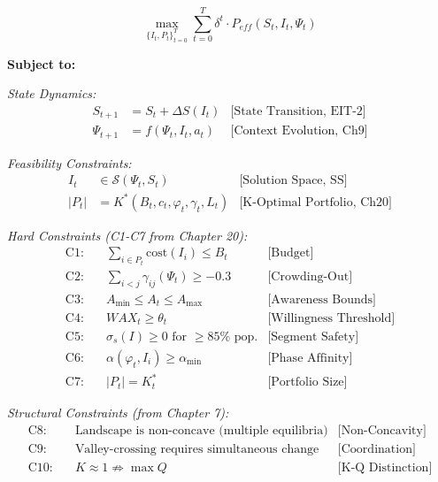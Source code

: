 \begin{tcolorbox}[colback=blue!5!white, colframe=blue!75!black,
    title=\textbf{The EBF Master Problem (MP-1)}]

\begin{equation}
\boxed{
\max_{\{I_t, P_t\}_{t=0}^T} \sum_{t=0}^{T} \delta^t \cdot P_{eff}(S_t, I_t, \Psi_t)
}
\label{eq:mp-objective}
\end{equation}

\textbf{Subject to:}

\vspace{0.3em}
\textit{State Dynamics:}
\begin{align}
S_{t+1} &= S_t + \Delta S(I_t) & \text{[State Transition, EIT-2]} \label{eq:mp-state} \\
\Psi_{t+1} &= f(\Psi_t, I_t, a_t) & \text{[Context Evolution, Ch9]} \label{eq:mp-context}
\end{align}

\textit{Feasibility Constraints:}
\begin{align}
I_t &\in \mathcal{S}(\Psi_t, S_t) & \text{[Solution Space, SS]} \label{eq:mp-feasible} \\
|P_t| &= K^*(B_t, c_t, \varphi_t, \gamma_t, L_t) & \text{[K-Optimal Portfolio, Ch20]} \label{eq:mp-kstar}
\end{align}

\textit{Hard Constraints (C1-C7 from Chapter 20):}
\begin{align}
\text{C1:} \quad & \sum_{i \in P_t} \text{cost}(I_i) \leq B_t & \text{[Budget]} \\
\text{C2:} \quad & \sum_{i < j} \gamma_{ij}(\Psi_t) \geq -0.3 & \text{[Crowding-Out]} \\
\text{C3:} \quad & A_{\min} \leq A_t \leq A_{\max} & \text{[Awareness Bounds]} \\
\text{C4:} \quad & WAX_t \geq \theta_t & \text{[Willingness Threshold]} \\
\text{C5:} \quad & \sigma_s(I) \geq 0 \text{ for } \geq 85\% \text{ pop.} & \text{[Segment Safety]} \\
\text{C6:} \quad & \alpha(\varphi_t, I_i) \geq \alpha_{\min} & \text{[Phase Affinity]} \\
\text{C7:} \quad & |P_t| = K^*_t & \text{[Portfolio Size]}
\end{align}

\textit{Structural Constraints (from Chapter 7):}
\begin{align}
\text{C8:} \quad & \text{Landscape is non-concave (multiple equilibria)} & \text{[Non-Concavity]} \\
\text{C9:} \quad & \text{Valley-crossing requires simultaneous change} & \text{[Coordination]} \\
\text{C10:} \quad & K \approx 1 \not\Rightarrow \max Q & \text{[K-Q Distinction]}
\end{align}

\end{tcolorbox}


